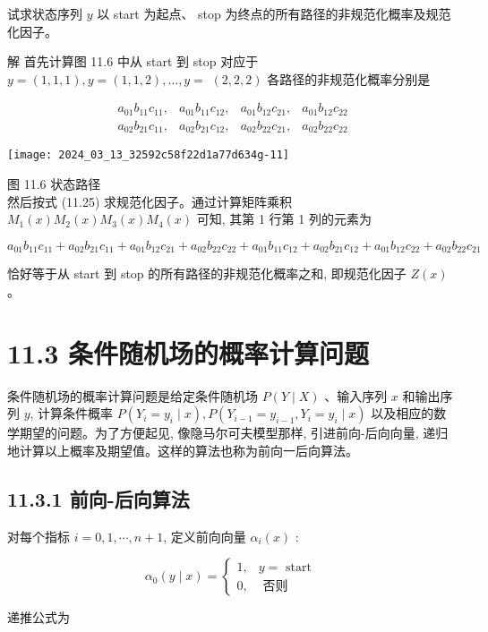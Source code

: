 \documentclass[10pt]{article}
\begin{document}
\begin{CJK*}{UTF8}{bsmi}
试求状态序列 $y$ 以 start 为起点、 stop 为终点的所有路径的非规范化概率及规范化因子。

解 首先计算图 11.6 中从 start 到 stop 对应于 $y=(1,1,1), y=(1,1,2), \ldots, y=$ $(2,2,2)$ 各路径的非规范化概率分别是

$$
\begin{array}{llll}
a_{01} b_{11} c_{11}, & a_{01} b_{11} c_{12}, & a_{01} b_{12} c_{21}, & a_{01} b_{12} c_{22} \\
a_{02} b_{21} c_{11}, & a_{02} b_{21} c_{12}, & a_{02} b_{22} c_{21}, & a_{02} b_{22} c_{22}
\end{array}
$$

\begin{center}
\texttt{[image: 2024\_03\_13\_32592c58f22d1a77d634g-11]}
\end{center}

图 11.6 状态路径\\
然后按式 (11.25) 求规范化因子。通过计算矩阵乘积 $M_{1}(x) M_{2}(x) M_{3}(x) M_{4}(x)$ 可知, 其第 1 行第 1 列的元素为

$a_{01} b_{11} c_{11}+a_{02} b_{21} c_{11}+a_{01} b_{12} c_{21}+a_{02} b_{22} c_{22}+a_{01} b_{11} c_{12}+a_{02} b_{21} c_{12}+a_{01} b_{12} c_{22}+a_{02} b_{22} c_{21}$

恰好等于从 start 到 stop 的所有路径的非规范化概率之和, 即规范化因子 $Z(x)$ 。

\section*{11.3 条件随机场的概率计算问题}
条件随机场的概率计算问题是给定条件随机场 $P(Y \mid X)$ 、输入序列 $x$ 和输出序列 $y$, 计算条件概率 $P\left(Y_{i}=y_{i} \mid x\right), P\left(Y_{i-1}=y_{i-1}, Y_{i}=y_{i} \mid x\right)$ 以及相应的数学期望的问题。为了方便起见, 像隐马尔可夫模型那样, 引进前向-后向向量, 递归地计算以上概率及期望值。这样的算法也称为前向一后向算法。

\subsection*{11.3.1 前向-后向算法}
对每个指标 $i=0,1, \cdots, n+1$, 定义前向向量 $\alpha_{i}(x)$ :

\[
\alpha_{0}(y \mid x)= \begin{cases}1, & y=\text { start }  \tag{11.26}\\ 0, & \text { 否则 }\end{cases}
\]

递推公式为



\end{CJK*}
\end{document}
